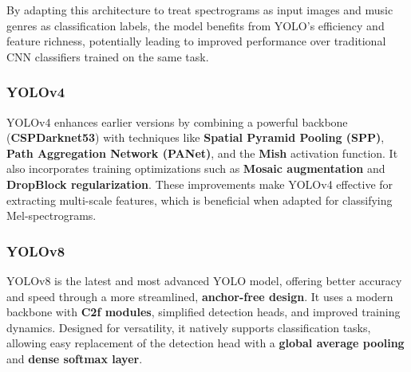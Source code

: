 \documentclass[a4paper,12pt]{article}
\begin{document}

By adapting this architecture to treat spectrograms as input images and music genres as classification labels, the model benefits from YOLO’s efficiency and feature richness, potentially leading to improved performance over traditional CNN classifiers trained on the same task.




\subsubsection{YOLOv4}

YOLOv4 enhances earlier versions by combining a powerful backbone (\textbf{CSP\-Dark\-net53}) with techniques like \textbf{Spatial Pyramid Pooling (SPP)}, \textbf{Path Aggregation Network (PANet)}, and the \textbf{Mish} activation function. It also incorporates training optimizations such as \textbf{Mosaic augmentation} and \textbf{DropBlock regularization}. These improvements make YOLOv4 effective for extracting multi-scale features, which is beneficial when adapted for classifying Mel-spectrograms. \cite{yolov4}

\subsubsection{YOLOv8}

YOLOv8 is the latest and most advanced YOLO model, offering better accuracy and speed through a more streamlined, \textbf{anchor-free design}. It uses a modern backbone with \textbf{C2f modules}, simplified detection heads, and improved training dynamics. Designed for versatility, it natively supports classification tasks, allowing easy replacement of the detection head with a \textbf{global average pooling} and \textbf{dense softmax layer}.
\end{document}
